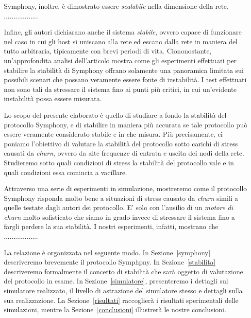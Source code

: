 \documentclass[prodmode,acmtap]{acmlarge}
\begin{document}
Symphony, inoltre, è dimostrato essere \emph{scalabile} nella dimensione della rete, ..................

Infine, gli autori dichiarano anche il sistema \emph{stabile}, ovvero capace di funzionare nel caso in cui gli host si uniscano alla rete ed escano dalla rete in maniera del tutto arbitraria, tipicamente con brevi periodi di vita. Ciononostante, un'approfondita analisi dell'articolo mostra come gli esperimenti effettuati per stabilire la stabilità di Symphony offrano solamente una panoramica limitata sui possibili scenari che possano veramente essere fonte di instabilità. I test effettuati non sono tali da stressare il sistema fino ai punti più critici, in cui un'evidente instabilità possa essere misurata.

Lo scopo del presente elaborato è quello di studiare a fondo la stabilità del protocollo Symphony, e di stabilire in maniera più accurata se tale protocollo può essere veramente considerato stabile e in che misura. Più precisamente, ci poniamo l'obiettivo di valutare la stabilità del protocollo sotto carichi di stress causati da \emph{churn}, ovvero da alte frequenze di entrata e uscita dei nodi della rete. Studieremo sotto quali condizioni di stress la stabilità del protocollo vale e in quali condizioni essa comincia a vacillare.

Attraverso una serie di esperimenti in simulazione, mostreremo come il protocollo Symphony risponda molto bene a situazioni di stress causato da \emph{churn} simili a quelle testate dagli autori dei protocollo. E' solo con l'ausilio di un \emph{motore di churn} molto sofisticato che siamo in grado invece di stressare il sistema fino a fargli perdere la sua stabilità. I nostri esperimenti, infatti, mostrano che ..................

La relazione è organizzata nel seguente modo. In Sezione~\ref{symphony} descriveremo brevemente il protocollo Symphpny. In Sezione~\ref{stabilita} descriveremo formalmente il concetto di stabilità che sarà oggetto di valutazione del protocollo in esame. In Sezione~\ref{simulatore}, presenteremo i dettagli sul simulatore realizzato, il livello di astrazione del simulatore stesso e dettagli sulla sua realizzazione. La Sezione~\ref{risultati} raccoglierà i risultati sperimentali delle simulazioni, mentre la Sezione~\ref{conclusioni} illustrerà le nostre conclusioni.
\end{document}
